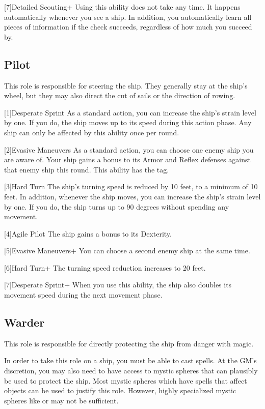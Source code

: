     [7]{Detailed Scouting+} Using this ability does not take any time.
      It happens automatically whenever you see a ship.
      In addition, you automatically learn all pieces of information if the check succeeds, regardless of how much you succeed by.

  \subsection{Pilot}
    This role is responsible for steering the ship.
    They generally stay at the ship's wheel, but they may also direct the cut of sails or the direction of rowing.

    [1]{Desperate Sprint} As a standard action, you can increase the ship's strain level by one.
      If you do, the ship moves up to its speed during this action phase.
      Any ship can only be affected by this ability once per round.

    [2]{Evasive Maneuvers} As a standard action, you can choose one enemy ship you are aware of.
      Your ship gains a  bonus to its Armor and Reflex defenses against that enemy ship this round.
      This ability has the  tag.

    [3]{Hard Turn} The ship's turning speed is reduced by 10 feet, to a minimum of 10 feet.
      In addition, whenever the ship moves, you can increase the ship's strain level by one.
      If you do, the ship turns up to 90 degrees without spending any movement.

    [4]{Agile Pilot} The ship gains a  bonus to its Dexterity.

    [5]{Evasive Maneuvers+} You can choose a second enemy ship at the same time.

    [6]{Hard Turn+} The turning speed reduction increases to 20 feet.

    [7]{Desperate Sprint+} When you use this ability, the ship also doubles its movement speed during the next movement phase.

  \subsection{Warder}
    This role is responsible for directly protecting the ship from danger with magic.

    In order to take this role on a ship, you must be able to cast spells.
    At the GM's discretion, you may also need to have access to mystic spheres that can plausibly be used to protect the ship.
    Most mystic spheres which have spells that affect objects can be used to justify this role.
    However, highly specialized mystic spheres like  or  may not be sufficient.

